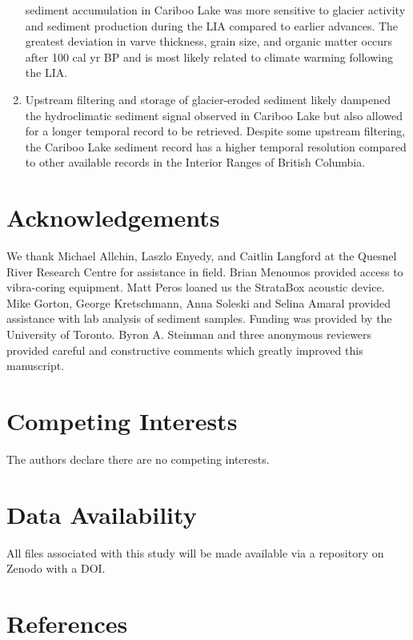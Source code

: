 \documentclass[
  letterpaper,
  DIV=11,
  numbers=noendperiod]{scrartcl}
\begin{document}
\begin{enumerate}
  sediment accumulation in Cariboo Lake was more sensitive to glacier
  activity and sediment production during the LIA compared to earlier
  advances. The greatest deviation in varve thickness, grain size, and
  organic matter occurs after 100 cal yr BP and is most likely related
  to climate warming following the LIA.
\item
  Upstream filtering and storage of glacier-eroded sediment likely
  dampened the hydroclimatic sediment signal observed in Cariboo Lake
  but also allowed for a longer temporal record to be retrieved. Despite
  some upstream filtering, the Cariboo Lake sediment record has a higher
  temporal resolution compared to other available records in the
  Interior Ranges of British Columbia.
\end{enumerate}

\pagebreak

\section{Acknowledgements}\label{acknowledgements}

We thank Michael Allchin, Laszlo Enyedy, and Caitlin Langford at the
Quesnel River Research Centre for assistance in field. Brian Menounos
provided access to vibra-coring equipment. Matt Peros loaned us the
StrataBox acoustic device. Mike Gorton, George Kretschmann, Anna Soleski
and Selina Amaral provided assistance with lab analysis of sediment
samples. Funding was provided by the University of Toronto. Byron A.
Steinman and three anonymous reviewers provided careful and constructive
comments which greatly improved this manuscript.

\section{Competing Interests}\label{competing-interests}

The authors declare there are no competing interests.

\section{Data Availability}\label{data-availability}

All files associated with this study will be made available via a
repository on Zenodo with a DOI.

\pagebreak

\section{References}\label{references}
\end{document}
